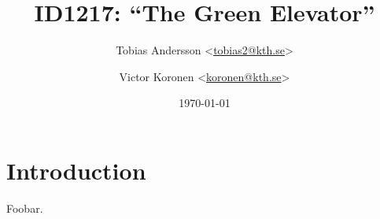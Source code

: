 \documentclass[a4paper]{article}
\title{ID1217: ``The Green Elevator''}
\author{%
    Tobias Andersson <\href{mailto:tobias2@kth.se}{tobias2@kth.se}> \and
    Victor Koronen <\href{mailto:koronen@kth.se}{koronen@kth.se}>
}
\date{\today}
\begin{document}
\maketitle
\thispagestyle{empty}

\section{Introduction}

Foobar.
\end{document}
